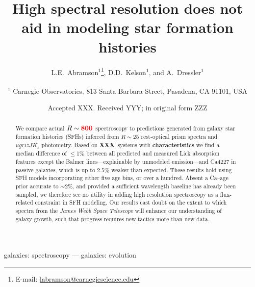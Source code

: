 \documentclass[a4paper,fleqn,usenatbib]{mnras}
\title[More is not better]{High spectral resolution does not aid in 
					modeling star formation histories}
\author[Abramson, Kelson, \& Dressler]{L.E.~Abramson$^{1}$\thanks{E-mail: \href{mailto:labramson@carnegiescience.edu}{labramson@carnegiescience.edu}},
D.D.~Kelson$^{1}$,
and A.~Dressler$^{1}$
\\
\\
$^1$	Carnegie Observatories, 813 Santa Barbara Street, Pasadena, CA 91101, USA\\
}
\date{Accepted XXX. Received YYY; in original form ZZZ}
\newcommand{\Mstel}{M_\ast}
\newcommand{\bfr}{\bf\color{red}}
\newcommand{\ntot}{{\bfr XXX}} %
\begin{document}
\label{firstpage}
\pagerange{\pageref{firstpage}--\pageref{lastpage}}
\maketitle

\begin{abstract}

	We compare actual $R\sim{\bfr 800}$ spectroscopy to predictions generated from galaxy 
	star formation histories (SFHs) inferred from $R\sim25$ rest-optical prism spectra 
	and $ugrizJK_{s}$ photometry. Based on \ntot\ systems with {\bfr characteristics} 
	we find a median difference of 
	$\leq$1\% between all predicted and measured Lick absorption features except the Balmer 
	lines---explainable by unmodeled emission---and Ca4227 in passive galaxies, 
	which is up to 2.5\% weaker than expected. These results hold using SFH models incorporating 
	either five age bins, or over a hundred. Absent a Ca--age prior accurate to 
	$\sim$2\%, and provided a sufficient wavelength baseline has already been sampled, 
	we therefore see no utility in adding high resolution spectroscopy as a flux-related 
	constraint	in SFH modeling. 
	Our results cast doubt on the extent to which 
	spectra from the {\it James Webb Space Telescope} will enhance our understanding of 
	galaxy growth, such that progress requires new tactics more than new data.

\end{abstract}

\begin{keywords}
	galaxies: spectroscopy --- galaxies: evolution
\end{keywords}

\end{document}
